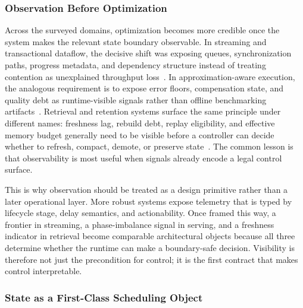 \documentclass[acmsmall,screen,review]{acmart}
\begin{document}
\subsubsection{Observation Before Optimization}

Across the surveyed domains, optimization becomes more credible once the system makes the relevant state boundary observable. In streaming and transactional dataflow, the decisive shift was exposing queues, synchronization paths, progress metadata, and dependency structure instead of treating contention as unexplained throughput loss~\cite{zhang2017revisiting,zhang2020concurrent,mao2023morphstream}. In approximation-aware execution, the analogous requirement is to expose error floors, compensation state, and quality debt as runtime-visible signals rather than offline benchmarking artifacts~\cite{zeng2024pecj,zeng2024libamm}. Retrieval and retention systems surface the same principle under different names: freshness lag, rebuild debt, replay eligibility, and effective memory budget generally need to be visible before a controller can decide whether to refresh, compact, demote, or preserve state~\cite{zhou2025ferret,zhang2026flowrag,wang2026candor}. The common lesson is that observability is most useful when signals already encode a legal control surface.

This is why observation should be treated as a design primitive rather than a later operational layer. More robust systems expose telemetry that is typed by lifecycle stage, delay semantics, and actionability. Once framed this way, a frontier in streaming, a phase-imbalance signal in serving, and a freshness indicator in retrieval become comparable architectural objects because all three determine whether the runtime can make a boundary-safe decision. Visibility is therefore not just the precondition for control; it is the first contract that makes control interpretable.

\subsubsection{State as a First-Class Scheduling Object}
\end{document}

